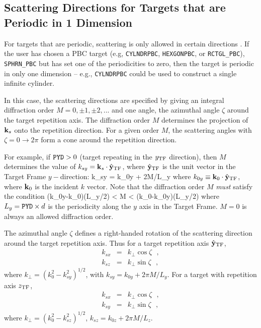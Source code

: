 \subsection{Scattering Directions for Targets that are Periodic in 1 Dimension
\label{sec:scattering_directions:1d}}

For targets that are periodic, scattering is only allowed in certain
directions \citep[see]{Draine+Flatau_2008a}.
If the user has chosen a PBC target (e.g,
{\tt CYLNDRPBC}, {\tt HEXGONPBC}, or {\tt RCTGL\_PBC}), {\tt SPHRN\_PBC}
but has set one of the periodicities to zero, then the target is
periodic in only one dimension -- e.g., {\tt CYLNDRPBC} could be used
to construct a single infinite cylinder.

In this case, the scattering directions are specified by giving an integral
diffraction order $M=0,\pm1,\pm2,...$ and one angle, the azimuthal angle
$\zeta$ around the target repetition axis.
The diffraction order $M$ determines the projection of ${\bf k}_{s}$
onto the repetition direction.
For a given order $M$, the scattering angles with $\zeta=0\rightarrow2\pi$
form a cone around the repetition direction.

For example, if ${\tt PYD}>0$ (target repeating in the $y_{\rm TF}$ direction),
then $M$ determines the value of $k_{sy}={\bf k}_s \cdot \hat{\bf y}_{\rm TF}$,
where $\hat{\bf y}_{\rm TF}$ is the unit vector in the Target Frame $y-$direction:
\beq
k_{sy} = k_{0y} + 2\pi M/L_y
\eeq
where $k_{0y}\equiv {\bf k}_0\cdot \hat{\bf y}_{\rm TF}$, where ${\bf k}_0$ 
is the incident
$k$ vector.
Note that  the
diffraction order $M$ {\it must} satisfy the condition 
\beq\label{eq:condition on M}
(k_{0y}-k_{0})(L_y/2\pi) < M < (k_0-k_{0y})(L_y/2\pi)
\eeq
where $L_y={\tt PYD}\times d$ is the periodicity along the $y$ axis in the
Target Frame.
$M=0$ is always an allowed diffraction order.

The azimuthal angle $\zeta$ defines a right-handed rotation of the
scattering direction around the target repetition axis.
Thus for a target repetition axis $\hat{\bf y}_{\rm TF}$,
\begin{eqnarray}
k_{sx} &=& k_\perp \cos\zeta ~~~,
\\
k_{sz} &=& k_\perp \sin\zeta ~~~,
\end{eqnarray}
where $k_\perp = (k_0^2-k_{sy}^2)^{1/2}$, with $k_{sy}=k_{0y}+2\pi M/L_y$.
For a target with repetition axis $z_{\rm TF}$,
\begin{eqnarray}
k_{sx} &=& k_\perp \cos\zeta ~~~,
\\
k_{sy} &=& k_\perp \sin\zeta ~~~,
\end{eqnarray}
where $k_\perp = (k_0^2-k_{sz}^2)^{1/2}$, $k_{sz}=k_{0z}+2\pi M/L_z$.

